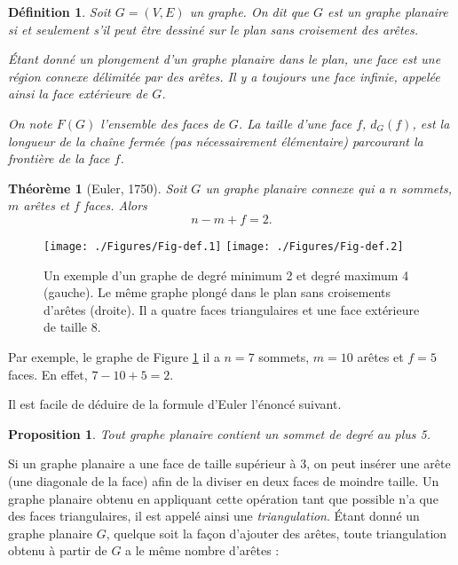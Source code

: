 \documentclass[10pt,a4paper]{article}
\newtheorem{definition}{Définition}
\newtheorem{theorem}{Théorème}
\newtheorem{proposition}{Proposition}
\begin{document}

\begin{definition}
Soit $G=(V,E)$ un graphe. On dit que $G$ est un graphe \emph{planaire} si et seulement s'il peut être dessiné sur le plan sans croisement des arêtes. 

Étant donné un plongement d'un graphe planaire dans le plan, une \emph{face} est une région connexe délimitée par des arêtes. Il y a toujours une face infinie, appelée ainsi la \emph{face extérieure} de $G$.

On note $F(G)$ l'ensemble des faces de $G$. La \emph{taille} d'une face $f$, $d_G(f)$, est la longueur de la chaîne fermée (pas nécessairement élémentaire) parcourant la frontière de la face $f$.
\end{definition}

\begin{theorem}[Euler, 1750]
Soit $G$ un graphe planaire connexe qui a $n$ sommets, $m$ arêtes et $f$ faces. Alors
$$
n - m + f = 2.
$$
\end{theorem}

\begin{figure}[ht]
\centerline{
\texttt{[image: ./Figures/Fig-def.1]}
\hfil
\texttt{[image: ./Figures/Fig-def.2]}
}
\caption{Un exemple d'un graphe de degré minimum 2 et degré maximum 4 (gauche). Le même graphe plongé dans le plan sans croisements d'arêtes (droite). Il a quatre faces triangulaires et une face extérieure de taille 8.}
\label{fig:ex}
\end{figure}

Par exemple, le graphe de Figure \ref{fig:ex} il a $n=7$ sommets, $m=10$ arêtes et $f=5$ faces. En effet, $7 - 10 + 5 = 2$.

Il est facile de déduire de la formule d'Euler l'énoncé suivant.

\begin{proposition}
Tout graphe planaire contient un sommet de degré au plus 5.
\end{proposition}


Si un graphe planaire a une face de taille supérieur à 3, on peut insérer une arête (une diagonale de la face) afin de la diviser en deux faces de moindre taille. Un graphe planaire obtenu en appliquant cette opération tant que possible n'a que des faces triangulaires, il est appelé ainsi une \emph{triangulation}. Étant donné un graphe planaire $G$, quelque soit la façon d'ajouter des arêtes, toute triangulation obtenu à partir de $G$ a le même nombre d'arêtes :
\end{document}
